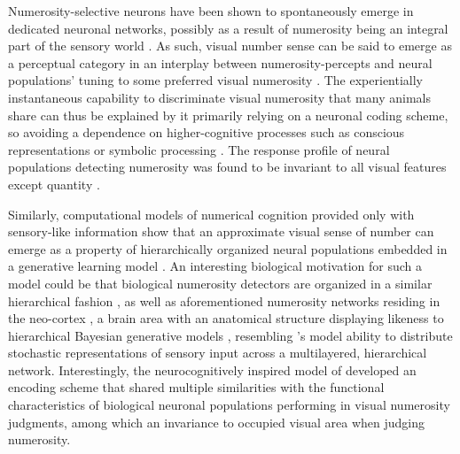 \documentclass[twocolumn]{article}
\begin{document}
Numerosity-selective neurons have been shown to spontaneously emerge in dedicated neuronal networks, possibly as a result of numerosity being an integral part of the sensory world \citep{viswanathan2013neuronal}. As such, visual number sense can be said to emerge as a perceptual category in an interplay between numerosity-percepts and neural populations' tuning to some preferred visual numerosity \citep{nieder2016neuronal}. The experientially instantaneous capability to discriminate visual numerosity that many animals share \citep{nieder2016neuronal, animalsnumericalcognition} can thus be explained by it primarily relying on a neuronal coding scheme, so avoiding a dependence on higher-cognitive processes such as conscious representations \citep[p.~58 points to types of visual number sense being pre-attentive]{dehaene2011number} or symbolic processing \citep[visual numerosity percepts are understood non-verbally,][]{nieder2016neuronal}. The response profile of neural populations detecting numerosity was found to be invariant to all visual features except quantity \citep{nieder2016neuronal, harvey2013topographic}.

Similarly, computational models of numerical cognition provided only with sensory-like information  show that an approximate visual sense of number can emerge as a property of hierarchically organized neural populations embedded in a generative learning model \citep{stoianov2012}. An interesting biological motivation for such a model could be that biological numerosity detectors are organized in a similar hierarchical fashion \citep{nieder2016neuronal, viswanathan2013neuronal}, as well as aforementioned numerosity networks residing in the neo-cortex \citep{nieder2016neuronal}, a brain area with an anatomical structure displaying likeness to hierarchical Bayesian generative models
\citetext{\citealp{friston2003learning}; although the brain in general is sometimes characterized as a probabilistic modeler of it's sensory world, e.g. \citealp{bayesianbrain, griffiths2006optimal}}, resembling \citet{stoianov2012}'s model ability to distribute stochastic representations of sensory input across a multilayered, hierarchical network. Interestingly, the neurocognitively inspired model of \citet{stoianov2012} developed an encoding scheme that shared multiple similarities with the functional characteristics of biological neuronal populations performing in visual numerosity judgments, among which an invariance to occupied visual area when judging numerosity.
\end{document}
